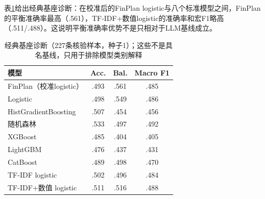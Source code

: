 \documentclass[12pt,openany]{ctexbook}
\begin{document}
表\ref{tab:classical-zh}给出经典基座诊断：在校准后的FinPlan logistic与八个标准模型之间，FinPlan的平衡准确率最高（.561），TF-IDF+数值logistic的准确率和宏F1略高（.511/.488）。这说明平衡准确率优势不是只相对于LLM基线成立。\par
\begin{table}[htbp]
\centering
\caption{经典基座诊断（227条核验样本，种子1）；这些不是具名基线，只用于排除模型类别解释}
\label{tab:classical-zh}
\setlength{\tabcolsep}{3pt}
\begin{tabular}{lccc}
\toprule
模型 & Acc. & Bal. & Macro F1 \\
\midrule
FinPlan（校准logistic） & .493 & .561 & .485 \\
Logistic & .498 & .549 & .486 \\
HistGradientBoosting & .507 & .454 & .456 \\
随机森林 & .533 & .497 & .492 \\
XGBoost & .485 & .404 & .405 \\
LightGBM & .476 & .437 & .431 \\
CatBoost & .489 & .498 & .470 \\
TF-IDF logistic & .502 & .496 & .484 \\
TF-IDF+数值 logistic & .511 & .516 & .488 \\
\bottomrule
\end{tabular}
\end{table}
\end{document}
